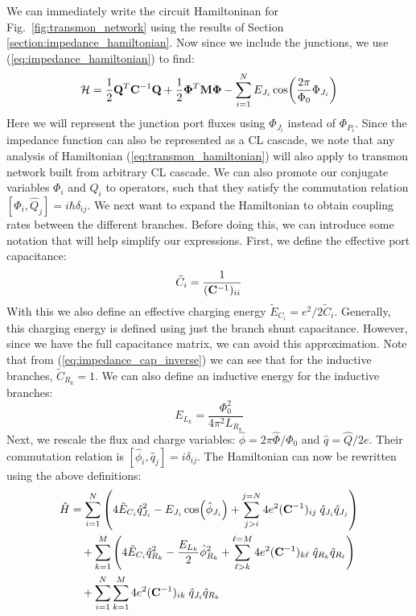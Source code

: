 We can immediately write the circuit Hamiltoninan for Fig.\ \ref{fig:transmon_network} using the results of Section \ref{section:impedance_hamiltonian}. Now since we include the junctions, we use (\ref{eq:impedance_hamiltonian}) to find:
\begin{equation}\label{eq:transmon_hamiltonian}
    \mathcal{H} = \frac{1}{2} \vb{Q}^T \vb{C}^{-1} \vb{Q} + \frac{1}{2} \vb{\Phi}^T \vb{M} \vb{\Phi} - \sum_{i=1}^N E_{J_i} \cos(\frac{2\pi}{\Phi_0} \Phi_{J_i})
\end{equation}
Here we will represent the junction port fluxes using $\Phi_{J_i}$ instead of $\Phi_{P_i}$. Since the impedance function can also be represented as a CL cascade, we note that any analysis of Hamiltonian (\ref{eq:transmon_hamiltonian}) will also apply to transmon network built from arbitrary CL cascade. We can also promote our conjugate variables $\Phi_{i}$ and $Q_i$ to operators, such that they satisfy the commutation relation $[\hat{\Phi}_i, \hat{Q}_j] = i\hbar \delta_{ij}$. We next want to expand the Hamiltonian to obtain coupling rates between the different branches. Before doing this, we can introduce some notation that will help simplify our expressions. First, we define the effective port capacitance:
\begin{equation}\label{eq:effective_capacitiance}
    \tilde{C}_i = \frac{1}{(\vb{C}^{-1})_{ii}}
\end{equation}
With this we also define an effective charging energy $\tilde{E}_{C_i} = e^2/2\tilde{C}_i$. Generally, this charging energy is defined using just the branch shunt capacitance. However, since we have the full capacitance matrix, we can avoid this approximation. Note that from (\ref{eq:impedance_cap_inverse}) we can see that for the inductive branches, $\tilde{C}_{R_k} = 1$. We can also define an inductive energy for the inductive branches:
\begin{equation}
    E_{L_{k}} = \frac{\Phi_0^2}{4\pi^2 L_{R_k}}
\end{equation}
Next, we rescale the flux and charge variables: $\hat{\phi} = 2\pi\hat{\Phi}/\Phi_0$ and $\hat{q} = \hat{Q}/2e$. Their commutation relation is $[\hat{\phi}_i, \hat{q}_j] = i\delta_{ij}$. The Hamiltonian can now be rewritten using the above definitions:
\begin{align}
\begin{split}
    \hat{H} &= \sum_{i=1}^N \left(  4\tilde{E}_{C_i}\hat{q}_{J_i}^2 - E_{J_i}\cos(\hat{\phi}_{J_i})  + \sum_{j > i}^{j=N} 4e^2(\vb{C}^{-1})_{ij}\;  \hat{q}_{J_i}\hat{q}_{J_j} \right) \\
    &\quad + \sum_{k=1}^M \left( 4\tilde{E}_{C_i}\hat{q}_{R_k}^2 - \frac{E_{L_k}}{2}\hat{\phi}_{R_k}^2  + \sum_{\ell > k}^{\ell = M} 4e^2(\vb{C}^{-1})_{k\ell}\;  \hat{q}_{R_k}\hat{q}_{R_\ell} \right) \\ 
    &\quad + \sum_{i=1}^N \sum_{k=1}^M 4e^2(\vb{C}^{-1})_{ik}\; \hat{q}_{J_i}\hat{q}_{R_k}
\end{split}
\end{align}
